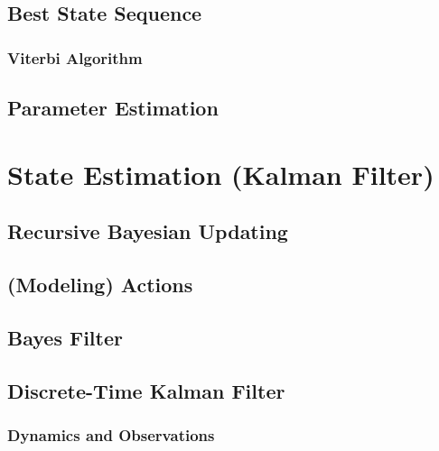         \subsection{Best State Sequence} %

            \subsubsection{Viterbi Algorithm} %

        \subsection{Parameter Estimation} %

    \section{State Estimation (Kalman Filter)} %

        \subsection{Recursive Bayesian Updating} %

        \subsection{(Modeling) Actions} %

        \subsection{Bayes Filter} %

        \subsection{Discrete-Time Kalman Filter} %

            \subsubsection{Dynamics and Observations} %


